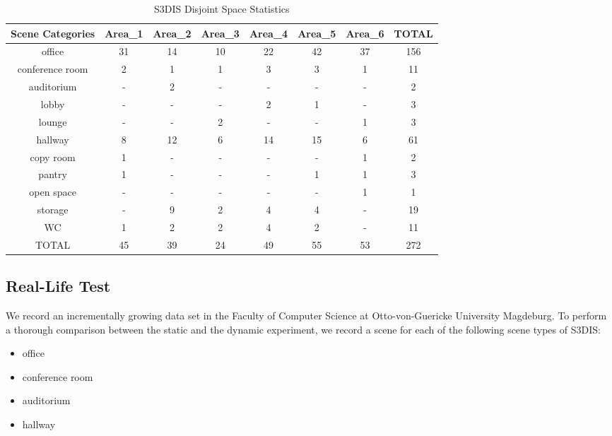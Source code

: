 \documentclass[main.tex]{subfiles}
\begin{document}
\begin{table}[H]
    \centering
    \begin{tabular}{c|c|c|c|c|c|c|c}
        \hline
        Scene Categories & Area\_1 & Area\_2 & Area\_3 & Area\_4 & Area\_5 & Area\_6 & TOTAL \\ \hline
        office           & 31      & 14      & 10      & 22      & 42      & 37      & 156   \\ \hline
        conference room  & 2       & 1       & 1       & 3       & 3       & 1       & 11    \\ \hline
        auditorium       & -       & 2       & -       & -       & -       & -       & 2     \\ \hline
        lobby            & -       & -       & -       & 2       & 1       & -       & 3     \\ \hline
        lounge           & -       & -       & 2       & -       & -       & 1       & 3     \\ \hline
        hallway          & 8       & 12      & 6       & 14      & 15      & 6       & 61    \\ \hline
        copy room        & 1       & -       & -       & -       & -       & 1       & 2     \\ \hline
        pantry           & 1       & -       & -       & -       & 1       & 1       & 3     \\ \hline
        open space       & -       & -       & -       & -       & -       & 1       & 1     \\ \hline
        storage          & -       & 9       & 2       & 4       & 4       & -       & 19    \\ \hline
        WC               & 1       & 2       & 2       & 4       & 2       & -       & 11    \\ \hline
        TOTAL            & 45      & 39      & 24      & 49      & 55      & 53      & 272   \\
    \end{tabular}
    \caption{S3DIS Disjoint Space Statistics}
    \label{tab:stanfordStats}
\end{table}

\subsection{Real-Life Test}
We record an incrementally growing data set in the Faculty of Computer Science at Otto-von-Guericke University Magdeburg.
To perform a thorough comparison between the static and the dynamic experiment, we record a scene for each of the following scene types of S3DIS:
\begin{itemize}
    \item office
    \item conference room
    \item auditorium
    \item hallway
\end{itemize}
\end{document}
